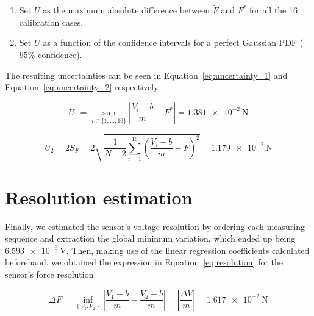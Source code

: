 \documentclass[12pt]{article}
\begin{document}
        \begin{enumerate}
                \item Set \( U \) as the maximum absolute difference between \( \widetilde{F} \) and \( F^{*} \) for all the 16 calibration cases.
                \item Set \( U \) as a function of the confidence intervals for a perfect Gaussian PDF (\( 95\% \) confidence).
        \end{enumerate}

        The resulting uncertainties can be seen in Equation~\ref{eq:uncertainty_1} and Equation~\ref{eq:uncertainty_2} respectively.

        \begin{equation} \label{eq:uncertainty_1}
                U_1 = \sup_{i \in \{1,...,16\}} \left| \frac{V_i - b}{m} - F^* \right| = \SI{1.381e-2}{\newton}
        \end{equation}

        \begin{equation} \label{eq:uncertainty_2}
                U_2 = 2 \bar{S}_F = 2 \sqrt{\frac{1}{N-2} \sum_{i = 1}^{16}{\left(\frac{V_i - b}{m} - F\right)^2}} = \SI{1.179e-2}{\newton}
        \end{equation}

\section{Resolution estimation} \label{sec:resolution}

        Finally, we estimated the sensor's voltage resolution by ordering each measuring sequence and extraction the global minimum variation, which ended up being \( \SI{6.593e-6}{\volt} \). Then, making use of the linear regression coefficients calculated beforehand, we obtained the expression in Equation~\ref{eq:resolution} for the sensor's force resolution.

        \begin{equation} \label{eq:resolution}
                \Delta F = \inf_{\left\{ V_1, V_2 \right\}} \left| \frac{V_1 - b}{m} - \frac{V_2 - b}{m} \right| = \left| \frac{\Delta V}{m} \right| = \SI{1.617e-2}{\newton}
        \end{equation}



\end{document}
